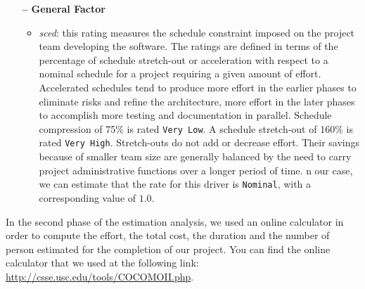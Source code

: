 \begin{itemize}
\begin{itemize}
	\end{itemize}
	
\item[\textbf{--}] \textbf{General Factor}

	\begin{itemize}
	
	\item \textit{\acl{sced}}: this rating measures the schedule constraint imposed on the project team developing the software. The ratings are defined in terms of the percentage of schedule stretch-out or acceleration with respect to a nominal schedule for a project requiring a given amount of effort. Accelerated schedules tend to produce more effort in the earlier phases to eliminate risks and refine the architecture, more effort in the later phases to accomplish more testing and documentation in parallel. Schedule compression of 75\% is rated \texttt{Very Low}. A schedule stretch-out of 160\% is rated \texttt{Very High}. Stretch-outs do not add or decrease effort. Their savings because of smaller team size are generally balanced by the need to carry project administrative functions over a longer period of time. n our case, we can estimate that the rate for this driver is \texttt{Nominal}, with a corresponding value of $1.0$.
	
	\end{itemize}

\end{itemize}

In the second phase of the estimation analysis, we used an online calculator in order to compute the effort, the total cost, the duration and the number of person estimated for the completion of our project.
You can find the online calculator that we used at the following link: \url{http://csse.usc.edu/tools/COCOMOII.php}.


